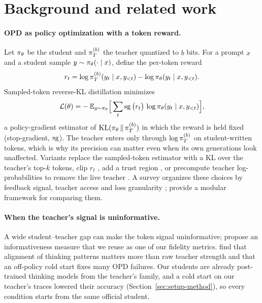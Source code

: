 \section{Background and related work}\label{sec:background}

\paragraph{OPD as policy optimization with a token reward.} Let $\pi_\theta$ be the student and
$\pi_T^{(b)}$ the teacher quantized to $b$ bits. For a prompt $x$ and a student sample
$y\sim\pi_\theta(\cdot\mid x)$, define the per-token reward
\begin{equation}
  r_t = \log \pi_T^{(b)}(y_t \mid x, y_{<t}) - \log \pi_\theta(y_t \mid x, y_{<t}).
  \label{eq:reward}
\end{equation}
Sampled-token reverse-KL distillation minimizes
\begin{equation}
  \mathcal{L}(\theta) = -\,\mathbb{E}_{y\sim\pi_\theta}\Big[\sum_t \operatorname{sg}\big(r_t\big)\,
  \log\pi_\theta(y_t\mid x, y_{<t})\Big],
  \label{eq:loss}
\end{equation}
a policy-gradient estimator of $\mathrm{KL}(\pi_\theta\,\|\,\pi_T^{(b)})$ in which the reward is held fixed
(stop-gradient, $\operatorname{sg}$). The teacher enters only through $\log\pi_T^{(b)}$ on student-written tokens,
which is why its precision can matter even when its own generations look unaffected.
Variants replace the sampled-token estimator with a KL over the teacher's top-$k$ tokens, clip
$r_t$ \citep{reopold2026}, add a trust region \citep{trustregionopd2026}, or precompute teacher
log-probabilities to remove the live teacher \citep{lightningopd2026}. A survey organizes these
choices by feedback signal, teacher access and loss granularity \citep{opdsurvey2026};
\citet{easyopd2026} provide a modular framework for comparing them.

\paragraph{When the teacher's signal is uninformative.} A wide student--teacher gap can make the
token signal uninformative; \citet{understandingopd2026} propose an informativeness measure that
we reuse as one of our fidelity metrics. \citet{rethinkingopd2026} find that alignment of
thinking patterns matters more than raw teacher strength and that an off-policy cold start
fixes many OPD failures. Our students are already post-trained thinking models from the
teacher's family, and a cold start on our teacher's traces lowered their accuracy
(Section~\ref{sec:setup-method}), so every condition starts from the same official student.

